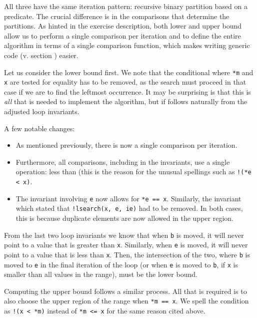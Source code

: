 All three have the same iteration pattern: recursive binary partition based on a
predicate.  The crucial difference is in the comparisons that determine the
partitions.  As hinted in the exercise description, both lower and upper bound
allow us to perform a single comparison per iteration and to define the entire
algorithm in terms of a single comparison function, which makes writing generic
code (v. section ) easier.

Let us consider the lower bound first.  We note that the conditional where
\texttt{*m} and \texttt{x} are tested for equality has to be removed, as the
search must proceed in that case if we are to find the leftmost occurrence.  It
may be surprising is that this is \emph{all} that is needed to implement the
algorithm, but if follows naturally from the adjusted loop invariants.



A few notable changes:

\begin{itemize}
    \item
        As mentioned previously, there is now a single comparison per iteration.
    \item
        Furthermore, all comparisons, including in the invariants, use a single
        operation: less than (this is the reason for the unusual spellings such
        as \texttt{!(*e < x)}.
    \item
        The invariant involving \texttt{e} now allows for \texttt{*e == x}.
        Similarly, the invariant which stated that \texttt{!lsearch(x, e, ie)}
        had to be removed.  In both cases, this is because duplicate elements
        are now allowed in the upper region.
\end{itemize}

From the last two loop invariants we know that when \texttt{b} is moved, it will
never point to a value that is greater than \texttt{x}.  Similarly, when
\texttt{e} is moved, it will never point to a value that is less than
\texttt{x}.  Then, the intersection of the two, where \texttt{b} is moved to
\texttt{e} in the final iteration of the loop (or when \texttt{e} is moved to
\texttt{b}, if \texttt{x} is smaller than all values in the range), must be the
lower bound.

Computing the upper bound follows a similar process.  All that is required is to
also choose the upper region of the range when \texttt{*m == x}.  We spell
the condition as \texttt{!(x < *m)} instead of \texttt{*m <= x} for the same
reason cited above.

